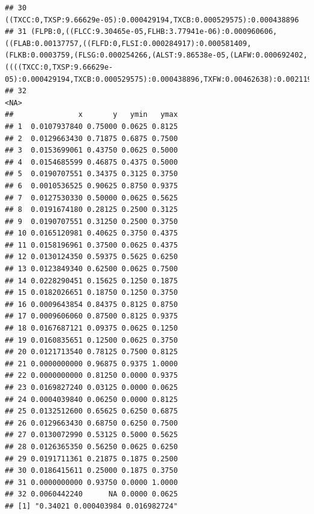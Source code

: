 \documentclass[]{article}
\begin{document}
\begin{verbatim}
## 30                                                                                                                                                                                                                                                                                                                                                              ((TXCC:0,TXSP:9.66629e-05):0.000429194,TXCB:0.000529575):0.000438896
## 31 (FLPB:0,((FLCC:9.30465e-05,FLHB:3.77941e-06):0.000960606,((FLAB:0.00137757,((FLFD:0,FLSI:0.000284917):0.000581409,(FLKB:0.0003759,(FLSG:0.000254266,(ALST:9.86538e-05,(LAFW:0.000692402,((((TXCC:0,TXSP:9.66629e-05):0.000429194,TXCB:0.000529575):0.000438896,TXFW:0.00462638):0.0021191,ALFW:0.000685147):0.000263869):0.00044979):0.00272304):0.000116498):0.000251601):0.00159115):0.0103898,FLLG:0.0165787):0.000403984):0);
## 32                                                                                                                                                                                                                                                                                                                                                                                                                              <NA>
##               x       y   ymin   ymax
## 1  0.0107937840 0.75000 0.0625 0.8125
## 2  0.0129663430 0.71875 0.6875 0.7500
## 3  0.0153699061 0.43750 0.0625 0.5000
## 4  0.0154685599 0.46875 0.4375 0.5000
## 5  0.0190707551 0.34375 0.3125 0.3750
## 6  0.0010536525 0.90625 0.8750 0.9375
## 7  0.0127530330 0.50000 0.0625 0.5625
## 8  0.0191674180 0.28125 0.2500 0.3125
## 9  0.0190707551 0.31250 0.2500 0.3750
## 10 0.0165120981 0.40625 0.3750 0.4375
## 11 0.0158196961 0.37500 0.0625 0.4375
## 12 0.0130124350 0.59375 0.5625 0.6250
## 13 0.0123849340 0.62500 0.0625 0.7500
## 14 0.0228290451 0.15625 0.1250 0.1875
## 15 0.0182026651 0.18750 0.1250 0.3750
## 16 0.0009643854 0.84375 0.8125 0.8750
## 17 0.0009606060 0.87500 0.8125 0.9375
## 18 0.0167687121 0.09375 0.0625 0.1250
## 19 0.0160835651 0.12500 0.0625 0.3750
## 20 0.0121713540 0.78125 0.7500 0.8125
## 21 0.0000000000 0.96875 0.9375 1.0000
## 22 0.0000000000 0.81250 0.0000 0.9375
## 23 0.0169827240 0.03125 0.0000 0.0625
## 24 0.0004039840 0.06250 0.0000 0.8125
## 25 0.0132512600 0.65625 0.6250 0.6875
## 26 0.0129663430 0.68750 0.6250 0.7500
## 27 0.0130072990 0.53125 0.5000 0.5625
## 28 0.0126365350 0.56250 0.0625 0.6250
## 29 0.0191711361 0.21875 0.1875 0.2500
## 30 0.0186415611 0.25000 0.1875 0.3750
## 31 0.0000000000 0.93750 0.0000 1.0000
## 32 0.0060442240      NA 0.0000 0.0625
## [1] "0.34021 0.000403984 0.016982724"
\end{verbatim}
\end{document}
